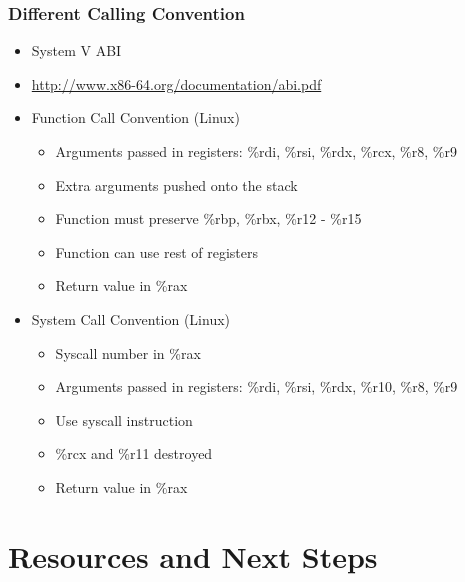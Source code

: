 \documentclass[11pt,xcolor=dvipsnames]{beamer}
\begin{document}
\begin{frame}[fragile,t]
\frametitle{Different Calling Convention}
\begin{itemize}
  \item System V ABI
  \item \url{http://www.x86-64.org/documentation/abi.pdf}
  \item Function Call Convention (Linux)
  \begin{itemize}
    \item Arguments passed in registers: {\ttfamily \%rdi, \%rsi, \%rdx, \%rcx, \%r8, \%r9}
    \item Extra arguments pushed onto the stack
    \item Function must preserve {\ttfamily \%rbp, \%rbx, \%r12 - \%r15}
    \item Function can use rest of registers
    \item Return value in {\%rax}
  \end{itemize}
  \item System Call Convention (Linux)
  \begin{itemize}
    \item Syscall number in {\ttfamily \%rax}
    \item Arguments passed in registers: {\ttfamily \%rdi, \%rsi, \%rdx, \%r10, \%r8, \%r9}
    \item Use {\ttfamily syscall} instruction
    \item {\ttfamily \%rcx} and {\ttfamily \%r11} destroyed
    \item Return value in {\%rax}
  \end{itemize}
\end{itemize}
\end{frame}

\section{Resources and Next Steps}
\end{document}
